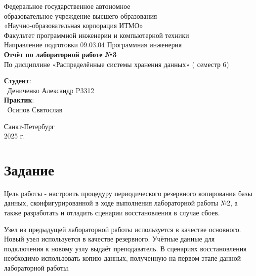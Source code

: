 \documentclass{article}
\begin{document}
\begin{center}
    \Large
    Федеральное государственное автономное \\
    образовательное учреждение высшего образования \\ 
    «Научно-образовательная корпорация ИТМО»\\
    \vspace{0.5cm}
    \large
    Факультет программной инженерии и компьютерной техники \\
    Направление подготовки 09.03.04 Программная инженерия \\
    \vspace{1cm}
    \Large
    \textbf{Отчёт по лабораторной работе №3} \\
        По дисциплине «Распределённые системы хранения данных» ( семестр 6)\\
    \large
    \vspace{8cm}

    \begin{minipage}{.33\textwidth}
    \end{minipage}
    \hfill
    \begin{minipage}{.4\textwidth}
    
        \textbf{Студент}: \vspace{.1cm} \\
        \ Дениченко Александр P3312\\
        \textbf{Практик}:  \\
        \ Осипов Святослав
    \end{minipage}
    \vfill
Санкт-Петербург\\ 2025 г.
\end{center}
\pagestyle{empty}
\newpage
\pagestyle{plain}

\section*{Задание}
Цель работы - настроить процедуру периодического резервного копирования базы данных, сконфигурированной в ходе выполнения лабораторной работы №2, а также разработать и отладить сценарии восстановления в случае сбоев.

Узел из предыдущей лабораторной работы используется в качестве основного. Новый узел используется в качестве резервного. Учётные данные для подключения к новому узлу выдаёт преподаватель. В сценариях восстановления необходимо использовать копию данных, полученную на первом этапе данной лабораторной работы.
\end{document}
